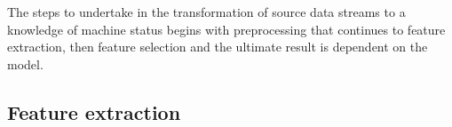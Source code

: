 The steps to undertake in the transformation of source data streams to a knowledge of machine status begins with
preprocessing that continues to feature extraction, then feature selection and the ultimate result is dependent on the model.

\subsection{Feature extraction}
\cite{zheng_feature_2018}
\cite{johnson_feature_2019}
\cite{altaf_new_2022}
\cite{mostafavi_novel_2021}
\cite{brito_fault_2021}
\cite{peeters_large_2004}
\cite{zhuo_research_2022}
\cite{mohammadi_early_2020}
\cite{egaji_data_2020}
\cite{nandi_condition_2019}

\cite{jung_vibration_2017}

